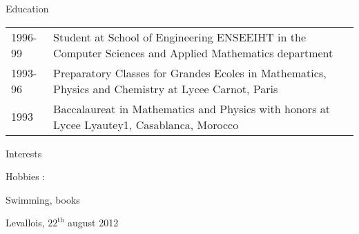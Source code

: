 \documentclass[a4paper,11pt]{letter}
\begin{document}
Education

\begin{tabular}{p{}p{}}
1996-99     & Student at School of Engineering ENSEEIHT in the Computer Sciences and Applied Mathematics department \\
1993-96     &  Preparatory Classes for Grandes Ecoles in Mathematics, Physics and Chemistry at Lycee Carnot, Paris \\
1993     &  Baccalaureat in Mathematics and Physics with honors at Lycee Lyautey1, Casablanca, Morocco \\
\end{tabular}

Interests

Hobbies :

Swimming, books

Levallois, $22^\mathrm{th}$ august 2012
\end{document}
